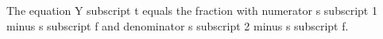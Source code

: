 The equation Y subscript t equals the fraction with numerator s subscript 1 minus s subscript f and denominator s subscript 2 minus s subscript f.